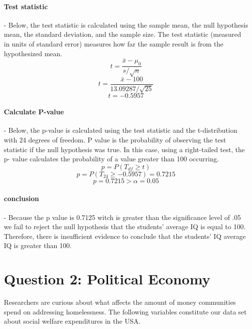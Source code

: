 \documentclass[12pt,letterpaper]{article}
\begin{document}
\begin{enumerate}
	\paragraph{Test statistic} - Below, the test statistic is calculated using the sample mean, the null hypothesis mean, the standard deviation, and the sample size. The test statistic (measured in units of standard error) measures how far the sample result is from the hypothesized mean.
	\[
	t = \frac{\bar{x} - \mu_0}{s/\sqrt{n}}
	\]	
	\[
	t = \frac{\bar{x} - 100}{13.09287/\sqrt{25}}
	\]
	\[
	t = -0.5957
	\]
	
	
	
	\paragraph{Calculate P-value} - Below, the p-value is calculated using the test statistic and the t-distribution with 24 degrees of freedom. P value is the probability of observing the test statistic if the null hypothesis was true. In this case, using a right-tailed test, the p- value calculates the probability of a value greater than 100 occurring. 
	\[
	p = P(T_{df} \geq t)
	\]
	\[
	p=P(T_{24}\geq -0.5957)=0.7215
	\]
	\[
	p = 0.7215 > \alpha = 0.05
	\]
	
	
	\paragraph{conclusion} - Because the p value is 0.7125 witch is greater than the significance level of .05 we fail to reject the null hypothesis that the students' average IQ is equal to 100. Therefore, there is insufficient evidence to conclude that the students' IQ average IQ is greater than 100.   

\end{enumerate}

\newpage

	\section*{Question 2: Political Economy}

\noindent Researchers are curious about what affects the amount of money communities spend on addressing homelessness. The following variables constitute our data set about social welfare expenditures in the USA. \\
\vspace{.5cm}
\end{document}
